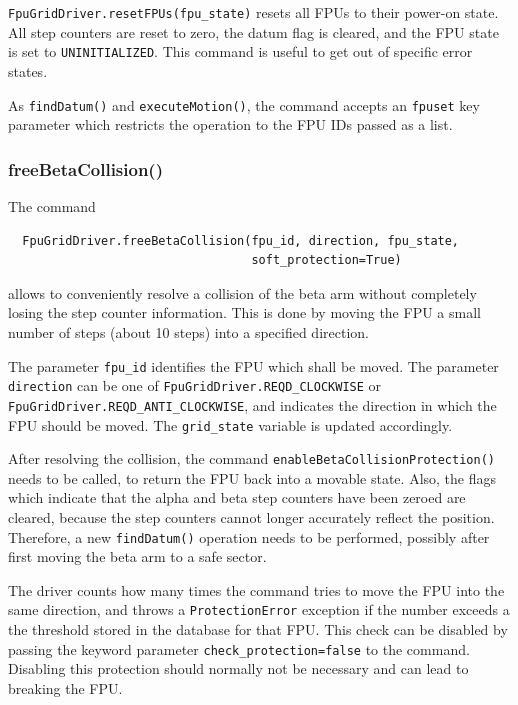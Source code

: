 \documentclass[11pt,a4paper]{report}
\begin{document}
\texttt{FpuGridDriver.resetFPUs(fpu\_state)} resets all FPUs to their
power-on state. All step counters are reset to zero, the datum flag is
cleared, and the FPU state is set to \texttt{UNINITIALIZED}. This
command is useful to get out of specific error states. 

As \texttt{findDatum()} and \texttt{executeMotion()}, the command
accepts an \texttt{fpuset} key parameter which restricts the operation
to the FPU IDs passed as a list.

\subsubsection{freeBetaCollision()}

The command
\begin{verbatim}
  FpuGridDriver.freeBetaCollision(fpu_id, direction, fpu_state,
                                  soft_protection=True)
\end{verbatim}
allows to conveniently resolve a collision
of the beta arm without completely losing the step counter
information. This is done by moving the FPU a small number of steps
(about 10 steps) into a specified direction.

\begin{sloppypar}
The parameter \texttt{fpu\_id} identifies the FPU which shall be
moved. The parameter \texttt{direction} can be one of
\texttt{FpuGridDriver.REQD\_CLOCKWISE} or
\texttt{FpuGridDriver.REQD\_ANTI\_CLOCKWISE}, and indicates the
direction in which the FPU should be moved. The \texttt{grid\_state}
variable is updated accordingly.
\end{sloppypar}

After resolving the collision, the command
\texttt{enableBetaCollisionProtection()} needs to be called, to return
the FPU back into a movable state.  Also, the flags which indicate
that the alpha and beta step counters have been zeroed are cleared,
because the step counters cannot longer accurately reflect the
position. Therefore, a new \texttt{findDatum()} operation needs to be
performed, possibly after first moving the beta arm to a safe sector.

The driver counts how many times the command tries to move the FPU
into the same direction, and throws a \texttt{ProtectionError}
exception if the number exceeds a the threshold stored in the database
for that FPU. This check can be disabled by passing the keyword
parameter \texttt{check\_protection=false} to the command. Disabling
this protection should normally not be necessary and can lead to
breaking the FPU.
\end{document}
